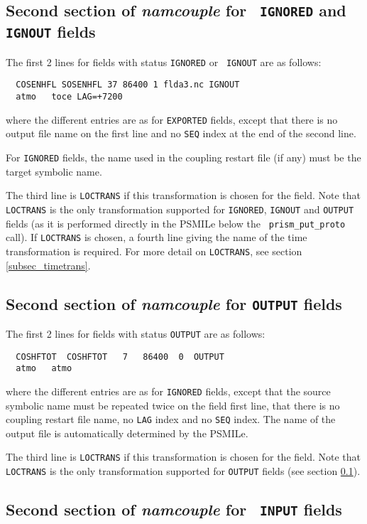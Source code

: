 \subsection{Second section of {\it namcouple} for {\tt
  IGNORED} and {\tt IGNOUT} fields}
\label{subsubsec_secondIGNORED}
  The first 2 lines for fields with status {\tt IGNORED} or {\tt
  IGNOUT} are as follows:
  \begin{verbatim}
  COSENHFL SOSENHFL 37 86400 1 flda3.nc IGNOUT 
  atmo   toce LAG=+7200\end{verbatim}
  where the different
  entries are as for {\tt EXPORTED} fields, except that there is no
  output file name on the first line and no {\tt SEQ} index at the end
  of the second line.

  For {\tt IGNORED} fields, the name used in the coupling restart file
  (if any) must be the target symbolic name.

  The third line is {\tt LOCTRANS} if this transformation is chosen
  for the field. Note that {\tt LOCTRANS} is the only transformation
  supported for {\tt IGNORED}, {\tt IGNOUT} and {\tt OUTPUT} fields
  (as it is performed directly in the PSMILe below the {\tt
  prism\_put\_proto} call). If {\tt LOCTRANS} is chosen, a fourth line
  giving the name of the time transformation is required. For more
  detail on {\tt LOCTRANS}, see section \ref{subsec_timetrans}.

\subsection{Second section of {\it namcouple} for {\tt OUTPUT} fields}
\label{subsubsec_secondOUTPUT}
  The first 2 lines for fields with status {\tt OUTPUT} are as follows:
  \begin{verbatim}
  COSHFTOT  COSHFTOT   7   86400  0  OUTPUT 
  atmo   atmo \end{verbatim}
where the different entries are as for {\tt IGNORED} fields, except
that the source symbolic name must be repeated twice on the field
first line, that there is no coupling restart file name, no {\tt LAG}
index and no {\tt SEQ} index. The name of the output file is
automatically determined by the PSMILe.

The third line is {\tt LOCTRANS} if this transformation is chosen for
the field. Note that {\tt LOCTRANS} is the only transformation
supported for {\tt OUTPUT} fields (see section
\ref{subsubsec_secondIGNORED}).

\subsection{Second section of {\it namcouple} for {\tt
  INPUT} fields}
\label{subsubsec_secondINPUT}

